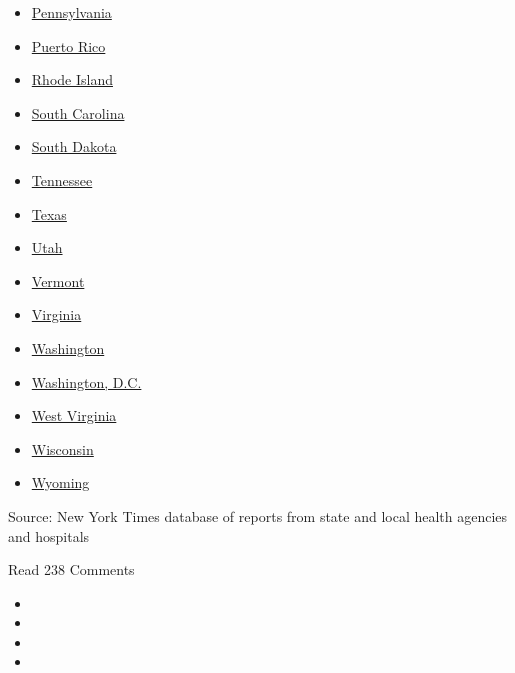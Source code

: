 \begin{itemize}
\item
  \href{https://www.nytimes.com/interactive/2020/us/pennsylvania-coronavirus-cases.html}{Pennsylvania}
\item
  \href{https://www.nytimes.com/interactive/2020/us/puerto-rico-coronavirus-cases.html}{Puerto
  Rico}
\item
  \href{https://www.nytimes.com/interactive/2020/us/rhode-island-coronavirus-cases.html}{Rhode
  Island}
\item
  \href{https://www.nytimes.com/interactive/2020/us/south-carolina-coronavirus-cases.html}{South
  Carolina}
\item
  \href{https://www.nytimes.com/interactive/2020/us/south-dakota-coronavirus-cases.html}{South
  Dakota}
\item
  \href{https://www.nytimes.com/interactive/2020/us/tennessee-coronavirus-cases.html}{Tennessee}
\item
  \href{https://www.nytimes.com/interactive/2020/us/texas-coronavirus-cases.html}{Texas}
\item
  \href{https://www.nytimes.com/interactive/2020/us/utah-coronavirus-cases.html}{Utah}
\item
  \href{https://www.nytimes.com/interactive/2020/us/vermont-coronavirus-cases.html}{Vermont}
\item
  \href{https://www.nytimes.com/interactive/2020/us/virginia-coronavirus-cases.html}{Virginia}
\item
  \href{https://www.nytimes.com/interactive/2020/us/washington-coronavirus-cases.html}{Washington}
\item
  \href{https://www.nytimes.com/interactive/2020/us/washington-dc-coronavirus-cases.html}{Washington,
  D.C.}
\item
  \href{https://www.nytimes.com/interactive/2020/us/west-virginia-coronavirus-cases.html}{West
  Virginia}
\item
  \href{https://www.nytimes.com/interactive/2020/us/wisconsin-coronavirus-cases.html}{Wisconsin}
\item
  \href{https://www.nytimes.com/interactive/2020/us/wyoming-coronavirus-cases.html}{Wyoming}
\end{itemize}

Source: New York Times database of reports from state and local health
agencies and hospitals

Read 238 Comments

\begin{itemize}
\item
\item
\item
\item
\end{itemize}

